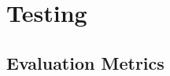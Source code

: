 \textcolor{dimgray}{\lipsum}


\section{Testing}
\label{sec:testing}

\textcolor{dimgray}{\lipsum[1-15]}


\subsection{Evaluation Metrics}
\label{subsec:evaluation-metrics}

\textcolor{dimgray}{\lipsum[1-20]}

